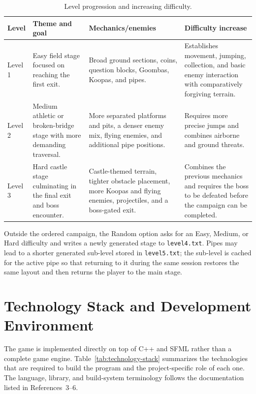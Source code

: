 \documentclass{template}
\begin{document}
\begin{table}[H]
    \centering
    \caption{Level progression and increasing difficulty.}
    \label{tab:levels}
    \begin{tabularx}{\textwidth}{@{}lXXX@{}}
        \toprule
        \textbf{Level} & \textbf{Theme and goal} & \textbf{Mechanics/enemies} &
        \textbf{Difficulty increase} \\
        \midrule
        Level 1 & Easy field stage focused on reaching the first exit. & Broad
        ground sections, coins, question blocks, Goombas, Koopas, and pipes. &
        Establishes movement, jumping, collection, and basic enemy interaction
        with comparatively forgiving terrain. \\
        Level 2 & Medium athletic or broken-bridge stage with more demanding
        traversal. & More separated platforms and pits, a denser enemy mix,
        flying enemies, and additional pipe positions. & Requires more precise
        jumps and combines airborne and ground threats. \\
        Level 3 & Hard castle stage culminating in the final exit and boss
        encounter. & Castle-themed terrain, tighter obstacle placement, more
        Koopas and flying enemies, projectiles, and a boss-gated exit. & Combines
        the previous mechanics and requires the boss to be defeated before the
        campaign can be completed. \\
        \bottomrule
    \end{tabularx}
\end{table}

Outside the ordered campaign, the Random option asks for an Easy, Medium, or
Hard difficulty and writes a newly generated stage to \texttt{level4.txt}.
Pipes may lead to a shorter generated sub-level stored in \texttt{level5.txt};
the sub-level is cached for the active pipe so that returning to it during the
same session restores the same layout and then returns the player to the main
stage.

\clearpage
\section{Technology Stack and Development Environment}

The game is implemented directly on top of C++ and SFML rather than a complete
game engine. Table~\ref{tab:technology-stack} summarizes the technologies that
are required to build the program and the project-specific role of each one.
The language, library, and build-system terminology follows the documentation
listed in References~3--6.
\end{document}
